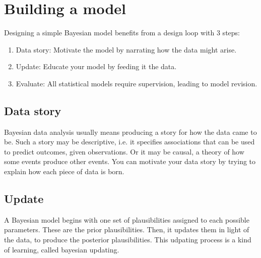 \documentclass[11pt]{article}
\date{\today}
\title{}
\begin{document}
\tableofcontents


\section{Building a model}
\label{sec:orgbddc419}
Designing a simple Bayesian model benefits from a design loop with 3 steps:
\begin{enumerate}
\item Data story: Motivate the model by narrating how the data might arise.
\item Update: Educate your model by feeding it the data.
\item Evaluate: All statistical models require supervision, leading to model revision.
\end{enumerate}
\subsection{Data story}
\label{sec:org8671a31}
Bayesian data analysis usually means producing a story for how the data came to be.
Such a story may be descriptive, i.e. it specifies associations that can be used
to predict outcomes, given observations.
Or it may be causal, a theory of how some events produce other events.
You can motivate your data story by trying to explain how each piece of data is
born.
\subsection{Update}
\label{sec:org794646c}
A Bayesian model begins with one set of plausibilities assigned to each possible
parameters. These are the prior plausibilities. Then, it
updates them in light of the data, to produce the posterior plausibilities. This
udpating process is a kind of learning, called bayesian updating.
\end{document}
